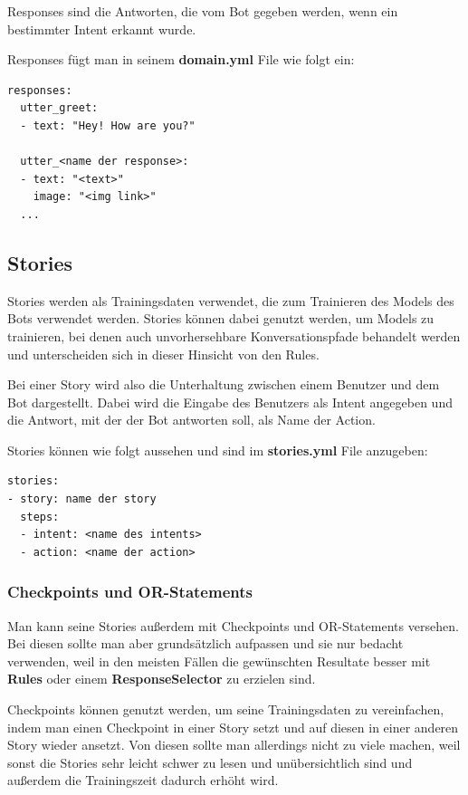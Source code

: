 Responses sind die Antworten, die vom Bot gegeben werden, wenn ein bestimmter Intent erkannt wurde.\cite{responses}

Responses fügt man in seinem \textbf{domain.yml} File wie folgt ein:

\begin{lstlisting}[label={lst: Responses Example}]
responses:
  utter_greet:
  - text: "Hey! How are you?"

  utter_<name der response>:
  - text: "<text>"
    image: "<img link>"
  ...
\end{lstlisting}


\subsection{Stories}

Stories werden als Trainingsdaten verwendet, die zum Trainieren des Models des Bots verwendet werden.
Stories können dabei genutzt werden, um Models zu trainieren, bei denen auch unvorhersehbare Konversationspfade behandelt werden und unterscheiden sich in dieser Hinsicht von den Rules.
\cite{stories}

Bei einer Story wird also die Unterhaltung zwischen einem Benutzer und dem Bot dargestellt.
Dabei wird die Eingabe des Benutzers als Intent angegeben und die Antwort, mit der der Bot antworten soll, als Name der Action.\cite{stories}

Stories können wie folgt aussehen und sind im \textbf{stories.yml} File anzugeben:

\begin{lstlisting}[label={lst: Stories Example}]
stories:
- story: name der story
  steps:
  - intent: <name des intents>
  - action: <name der action>
\end{lstlisting}

\subsubsection{Checkpoints und OR-Statements}

Man kann seine Stories außerdem mit Checkpoints und OR-Statements versehen.
Bei diesen sollte man aber grundsätzlich aufpassen und sie nur bedacht verwenden, weil in den meisten Fällen die gewünschten Resultate besser mit \textbf{Rules} oder einem \textbf{ResponseSelector} zu erzielen sind.
\cite{checkpointsor}

Checkpoints können genutzt werden, um seine Trainingsdaten zu vereinfachen, indem man einen Checkpoint in einer Story setzt und auf diesen in einer anderen Story wieder ansetzt.
Von diesen sollte man allerdings nicht zu viele machen, weil sonst die Stories sehr leicht schwer zu lesen und unübersichtlich sind und außerdem die Trainingszeit dadurch erhöht wird.
\cite{checkpoints}


